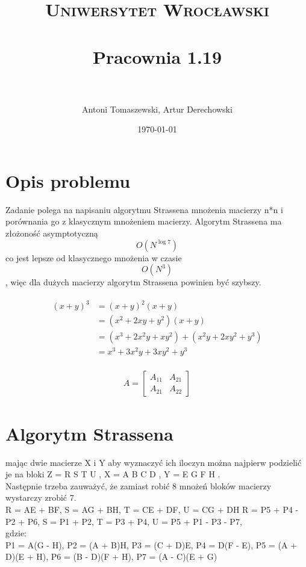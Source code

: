 \documentclass[paper=a4, fontsize=11pt]{scrartcl} %
\title{	
\normalfont \normalsize 
\textsc{Uniwersytet Wrocławski} \\ [25pt] %
\horrule{0.5pt} \\[0.4cm] %
\huge Pracownia 1.19 \\ %
\horrule{2pt} \\[0.5cm] %
}
\author{Antoni Tomaszewski, Artur Derechowski} %
\date{\normalsize\today} %
\numberwithin{equation}{section} %
\numberwithin{figure}{section} %
\numberwithin{table}{section} %
\begin{document}
\maketitle %


\section{Opis problemu}

Zadanie polega na napisaniu algorytmu Strassena mnożenia macierzy n*n  i porównania go z klasycznym mnożeniem macierzy. Algorytm Strassena ma złożoność asymptotyczną 
\[ O(N^{\log 7 } )\]
co jest lepsze od klasycznego mnożenia w czasie \[ O(N^{3} )\], więc dla dużych macierzy algorytm Strassena powinien być szybszy.

\begin{align} 
\begin{split}
(x+y)^3 	&= (x+y)^2(x+y)\\
&=(x^2+2xy+y^2)(x+y)\\
&=(x^3+2x^2y+xy^2) + (x^2y+2xy^2+y^3)\\
&=x^3+3x^2y+3xy^2+y^3
\end{split}					
\end{align}

\begin{align}
A = 
\begin{bmatrix}
A_{11} & A_{21} \\
A_{21} & A_{22}
\end{bmatrix}
\end{align}


\section{Algorytm Strassena}

mając dwie macierze X i Y aby wyznaczyć ich iloczyn można najpierw podzielić je na bloki
Z =  R S T U  , X =  A B C D  , Y =  E G F H  .\\
Następnie trzeba zauważyć, że zamiast robić 8 mnożeń bloków macierzy wystarczy zrobić 7.\\
R = AE + BF, S = AG + BH, T = CE + DF, U = CG + DH
R = P5 + P4 - P2 + P6, S = P1 + P2, T = P3 + P4, U = P5 + P1 - P3 - P7,\\
gdzie:\\
P1 = A(G - H), P2 = (A + B)H, P3 = (C + D)E, P4 = D(F - E), P5 = (A + D)(E + H), P6 = (B - D)(F + H), P7 = (A - C)(E + G)\\
\end{document}
